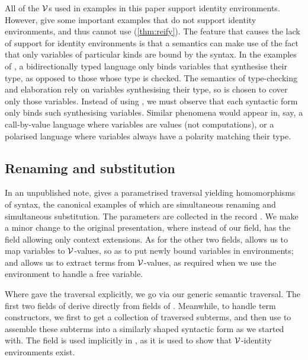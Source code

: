All of the $\V$s used in examples in this paper support identity environments.
However, \citet[p.~27]{AACMM21} give some important examples that do not
support identity environments, and thus cannot use 
(\cref{thm:reify}).
The feature that causes the lack of support for identity environments is that
a semantics can make use of the fact that only variables of particular kinds
are bound by the syntax.
In the examples of \citeauthor{AACMM21}, a bidirectionally typed language only
binds variables that synthesise their type, as opposed to those whose type is
checked.
The semantics of type-checking and elaboration rely on variables synthesising
their type, so \AgdaBound{$\V$} is chosen to cover only those variables.
Instead of using , we must observe that each syntactic form
only binds such synthesising variables.
Similar phenomena would appear in, say, a call-by-value language where
variables are values (not computations), or a polarised language where
variables always have a polarity matching their type.


\subsection{Renaming and substitution}\label{sec:kits}

In an unpublished note, \citet{McBride05} gives a parametrised traversal
yielding homomorphisms of syntax, the canonical examples of which are
simultaneous renaming and simultaneous substitution.
The parameters are collected in the record .
We make a minor change to the original presentation, where instead of our
 field, \citeauthor{McBride05} has the
field  allowing only context extensions.
As for the other two fields,  allows us to map variables to
$\V$-values, so as to put newly bound variables in environments; and
 allows us to extract terms from $\V$-values, as required when
we use the environment to handle a free variable.


Where \citeauthor{McBride05} gave the traversal explicitly, we go via our
generic semantic traversal.
The first two fields of  derive directly from fields of
.
Meanwhile, to handle term constructors, we first  to get a
collection of traversed subterms, and then use 
to assemble these subterms into a similarly shaped syntactic form as we started
with.
The  field is used implicitly in , as it is
used to show that $\V$-identity environments exist.

